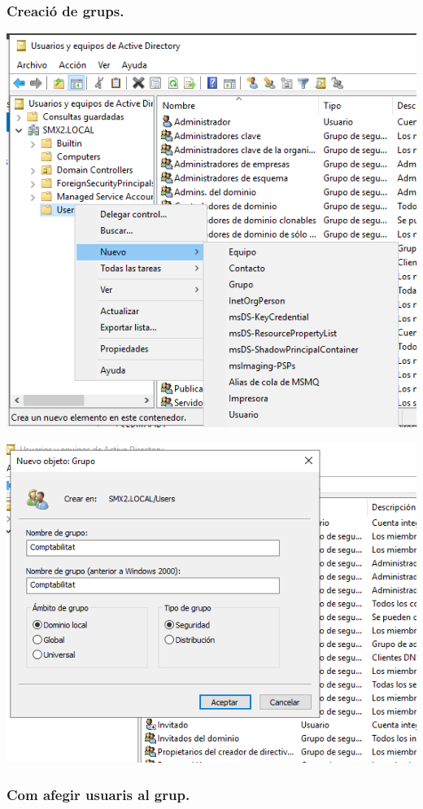 \documentclass[
  a4paper,
]{article}
\begin{document}
\subsubsection{Creació de grups.}\label{creaciuxf3-de-grups.}

\includegraphics{png/usuaris11.png}

\includegraphics{png/usuaris12.png}

\subsubsection{Com afegir usuaris al
grup.}\label{com-afegir-usuaris-al-grup.}
\end{document}
